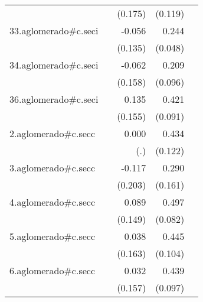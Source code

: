 {\begin{longtable}{l*{4}{D{.}{.}{-1}}}
            &                     &     (0.175)         &     (0.119)         &                     \\
\addlinespace
33.aglomerado#c.seci&                     &      -0.056         &       0.244\sym{***}&                     \\
            &                     &     (0.135)         &     (0.048)         &                     \\
\addlinespace
34.aglomerado#c.seci&                     &      -0.062         &       0.209\sym{*}  &                     \\
            &                     &     (0.158)         &     (0.096)         &                     \\
\addlinespace
36.aglomerado#c.seci&                     &       0.135         &       0.421\sym{***}&                     \\
            &                     &     (0.155)         &     (0.091)         &                     \\
\addlinespace
2.aglomerado#c.secc&                     &       0.000         &       0.434\sym{***}&                     \\
            &                     &         (.)         &     (0.122)         &                     \\
\addlinespace
3.aglomerado#c.secc&                     &      -0.117         &       0.290         &                     \\
            &                     &     (0.203)         &     (0.161)         &                     \\
\addlinespace
4.aglomerado#c.secc&                     &       0.089         &       0.497\sym{***}&                     \\
            &                     &     (0.149)         &     (0.082)         &                     \\
\addlinespace
5.aglomerado#c.secc&                     &       0.038         &       0.445\sym{***}&                     \\
            &                     &     (0.163)         &     (0.104)         &                     \\
\addlinespace
6.aglomerado#c.secc&                     &       0.032         &       0.439\sym{***}&                     \\
            &                     &     (0.157)         &     (0.097)         &                     \\

\end{longtable}}
